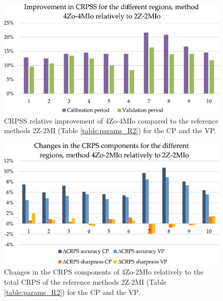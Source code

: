 \documentclass[5p]{elsarticle}
\begin{document}
\begin{figure}[htb]
	\centerline{\includegraphics[width=\linewidth]{figures/figure_dcrpss_4Zo-4HIo.pdf}}
	\caption{CRPSS relative improvement of 4Zo-4MIo compared to the reference methods 2Z-2MI (Table \ref{table:params_R2}) for the CP and the VP.}
	\label{fig:figure_dcrpss_4Zo-4HIo}
\end{figure}

\begin{figure}[htb]
	\centerline{\includegraphics[width=\linewidth]{figures/figure_dcrps_comp_4Zo-2HIo.pdf}}
	\caption{Changes in the CRPS components of 4Zo-2MIo relatively to the total CRPS of the reference methods 2Z-2MI (Table \ref{table:params_R2}) for the CP and the VP.}
	\label{fig:figure_dcrps_comp_4Zo-2HIo}
\end{figure}
\end{document}
